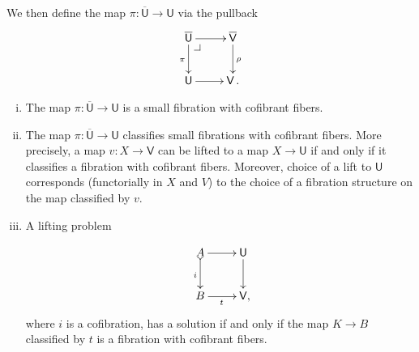 \documentclass[reqno,10pt,a4paper,oneside]{amsart}
\makeatletter
\numberwithin{equation}{section}
\theoremstyle{mythm}
\theoremstyle{mydef}
\theoremstyle{myrmk}
\newcommand{\pullback}[1]{\save*!/#1-1.2pc/#1:(-1,1)@^{|-}\restore}
\newcommand{\drpullback}{\pullback{dr}}
\newcommand{\co}{\colon}
\newcommand{\UU}{\overline{\mathsf{U}}}
\newcommand{\U}{\mathsf{U}}
\newcommand{\VV}{\overline{\mathsf{V}}}
\newcommand{\V}{\mathsf{V}}
\makeatother
\begin{document}
We then define the map $\pi \co \UU \to \U$ via the pullback 
\begin{equation}
\label{equ:def-of-pi}
\begin{gathered}
\xymatrix{
\UU \ar[r] \ar[d]_\pi \drpullback  & \VV \ar[d]^\rho \\
\U \ar[r] & \V \, . }
\end{gathered}
\end{equation}



\begin{proposition} \label{thm:universe-u}  \hfill 
\begin{enumerate}[(i)] 
\item The map $\pi \co \UU \to \U$ is a small fibration with cofibrant fibers.

\item The map $\pi \co \UU \to \U$ classifies small fibrations with cofibrant fibers. More precisely, a map $v \co X \to \V$ can be lifted to a map $X \to \U$ if and only if it classifies a fibration with cofibrant fibers. Moreover, choice of a lift to $\U$ corresponds (functorially in $X$ and $V$) to the choice of a fibration structure on the map classified by $v$.

\item A lifting problem

\[\xymatrix{
A \ar@{>->}[d]_i \ar[r] & \U \ar[d] \\
B \ar[r]_t & \V \mathrlap{,}
}
\]
where $i$ is a cofibration, has a solution if and only if the map $K \to B$ classified by $t$ is a fibration with cofibrant fibers.


\end{enumerate}
\end{proposition}
\end{document}
